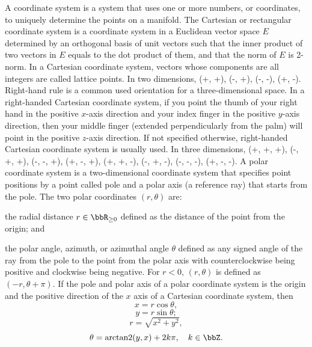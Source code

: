 A coordinate system is a system that uses one or more numbers, or coordinates, to uniquely determine the points on a manifold.
The Cartesian or rectangular coordinate system is a coordinate system in a Euclidean vector space $E$ determined by an orthogonal basis of unit vectors such that the inner product of two vectors in $E$ equals to the dot product of them, and that the norm of $E$ is 2-norm.
In a Cartesian coordinate system, vectors whose components are all integers are called lattice points.
In two dimensions,
(+, +), (-, +), (-, -), (+, -).
Right-hand rule is a common used orientation for a three-dimensional space. In a right-handed Cartesian coordinate system, if you point the thumb of your right hand in the positive $x$-axis direction and your index finger in the positive $y$-axis direction, then your middle finger (extended perpendicularly from the palm) will point in the positive $z$-axis direction. If not specified otherwise, right-handed Cartesian coordinate system is usually used.
In three dimensions, (+, +, +), (-, +, +), (-, -, +), (+, -, +), (+, +, -), (-, +, -), (-, -, -), (+, -, -).
A polar coordinate system is a two-dimensional coordinate system that specifies point positions by a point called pole and a polar axis (a reference ray) that starts from the pole. The two polar coordinates $(r,\theta)$ are:
\bit
\item the radial distance $r\in\bbR_{\geq 0}$ defined as the distance of the point from the origin; and
\item the polar angle, azimuth, or azimuthal angle $\theta$ defined as any signed angle of the ray from the pole to the point from the polar axis with counterclockwise being positive and clockwise being negative.
\eit
For $r<0$, $(r,\theta)$ is defined as $(-r,\theta+\pi)$.
If the pole and polar axis of a polar coordinate system is the origin and the positive direction of the $x$ axis of a Cartesian coordinate system, then
\[x=r\cos\theta,\]
\[y=r\sin\theta;\]
\[r=\sqrt{x^2+y^2},\]
\[\theta=\operatorname{arctan2}(y,x)+2k\pi,\quad k\in\bbZ.\]
